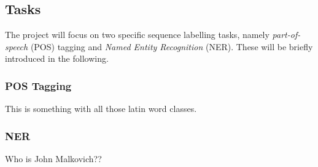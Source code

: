 
\subsection{Tasks}

The project will focus on two specific sequence labelling tasks, namely
\textit{part-of-speech} (POS) tagging and \textit{Named Entity Recognition}
(NER). These will be briefly introduced in the following.

\subsubsection{POS Tagging}

This is something with all those latin word classes.

\subsubsection{NER}

Who is John Malkovich??


